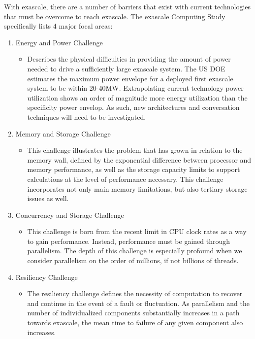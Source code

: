 With exascale, there are a number of barriers that exist with current technologies that must be overcome to reach exascale.  The exascale Computing Study \cite{bergman2008exascale} specifically lists 4 major focal areas:

\begin{enumerate}
\item Energy and Power Challenge
\begin{itemize}
\item Describes the physical difficulties in providing the amount of power needed to drive a sufficiently large exascale system. The US DOE estimates the maximum power envelope for a deployed first exascale system to be within 20-40MW. Extrapolating current technology power utilization shows an order of magnitude more energy utilization than the specificity power envelop. As such, new architectures and conversation techniques will need to be investigated. 
\end{itemize}
\item Memory and Storage Challenge 
\begin{itemize}
\item This challenge illustrates the problem that has grown in relation to the memory wall, defined by the exponential difference between processor and memory performance, as well as the storage capacity limits to support calculations at the level of performance necessary. This challenge incorporates not only main memory limitations, but also tertiary storage issues as well. 
\end{itemize}
\item Concurrency and Storage Challenge
\begin{itemize}
\item This challenge is born from the recent limit in CPU clock rates as a way to gain performance. Instead, performance must be gained through parallelism. The depth of this challenge is especially profound when we consider parallelism on the order of millions, if not billions of threads.  
\end{itemize}
\item Resiliency Challenge
\begin{itemize}
\item The resiliency challenge defines the necessity of computation to recover and continue in the event of a fault or fluctuation. As parallelism  and the number of individualized components substantially increases in a path towards exascale, the mean time to failure of any given component also increases.  
\end{itemize}
\end{enumerate}


